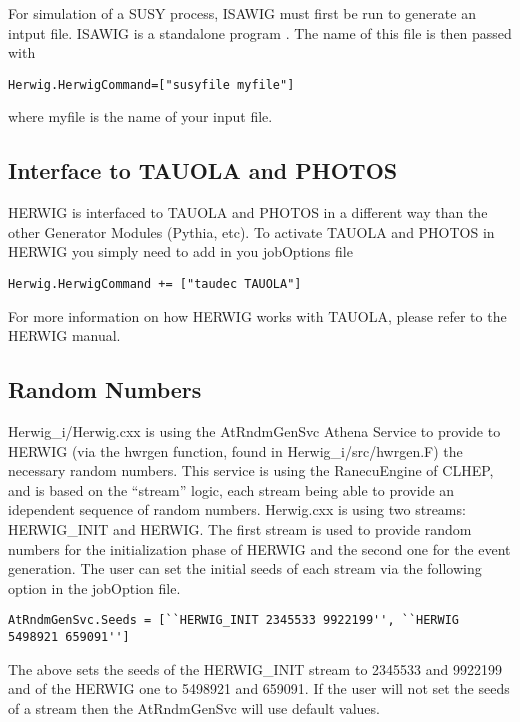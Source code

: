 \documentclass[11pt]{article}
\begin{document}
\noindent
For simulation of a SUSY process, ISAWIG must first be run to generate
an intput file. ISAWIG is a standalone program \cite{isawig}.
The name of this file is then passed with

\begin{verbatim}
Herwig.HerwigCommand=["susyfile myfile"] 
\end{verbatim}
where myfile is the name of your input file.

\subsection*{Interface to TAUOLA and PHOTOS}

\noindent
HERWIG is interfaced to TAUOLA and PHOTOS in a different way than the
other Generator Modules (Pythia, etc).  To activate TAUOLA and PHOTOS
in HERWIG you simply need to add in you jobOptions file
\begin{verbatim}
Herwig.HerwigCommand += ["taudec TAUOLA"]
\end{verbatim}
For more information on how HERWIG works with TAUOLA, please refer to
the HERWIG manual.

\subsection*{Random Numbers}

\noindent
Herwig\_i/Herwig.cxx is using the AtRndmGenSvc Athena Service to
provide to HERWIG (via the hwrgen function, found in
Herwig\_i/src/hwrgen.F) the necessary random numbers. This service is
using the RanecuEngine of CLHEP, and is based on the ``stream'' logic,
each stream being able to provide an idependent sequence of random
numbers. Herwig.cxx is using two streams: HERWIG\_INIT and HERWIG. The
first stream is used to provide random numbers for the initialization
phase of HERWIG and the second one for the event generation. The user
can set the initial seeds of each stream via the following option in
the jobOption file.

\begin{verbatim} 
AtRndmGenSvc.Seeds = [``HERWIG_INIT 2345533 9922199'', ``HERWIG 5498921 659091'']
\end{verbatim}



The above sets the seeds of the HERWIG\_INIT stream to 2345533 and
9922199 and of the HERWIG one to 5498921 and 659091. If the user will
not set the seeds of a stream then the AtRndmGenSvc will use default
values.
\end{document}

